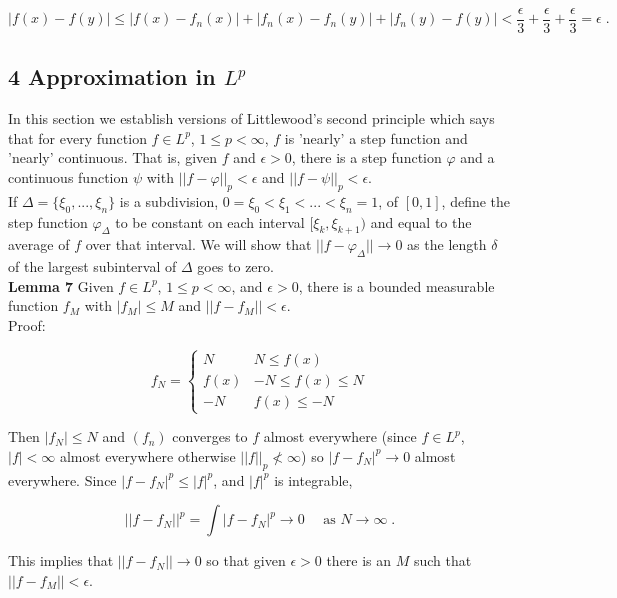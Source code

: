\documentclass[a4paper]{article}
\begin{document}
$$|f(x) - f(y)| \leq |f(x) - f_n(x)| + |f_n(x) - f_n(y)| + |f_n(y) - f(y)| < \frac{\epsilon}{3} + \frac{\epsilon}{3} + \frac{\epsilon}{3} = \epsilon \;.$$

\subsection*{4 Approximation in $L^p$}

In this section we establish versions of Littlewood's second principle which says that for every function $f \in L^p$, $1\leq p < \infty$, $f$ is 'nearly' a step function and 'nearly' continuous. That is, given $f$ and $\epsilon > 0$, there is a step function $\varphi$ and a continuous function $\psi$ with $||f- \varphi||_p < \epsilon$ and $||f - \psi ||_p < \epsilon$. \\

If $\Delta = \{\xi_0,...,\xi_n\}$ is a subdivision, $0 = \xi_0 < \xi_1 < ... < \xi_n = 1$, of $[0,1]$, define the step function $\varphi_{\Delta}$ to be constant on each interval $[\xi_k, \xi_{k+1})$ and equal to the average of $f$ over that interval. We will show that $||f - \varphi_{\Delta}|| \rightarrow 0$ as the length $\delta$ of the largest subinterval of $\Delta$ goes to zero.\\

{\bf Lemma 7} Given $f \in L^p$, $1\leq p < \infty$, and $\epsilon > 0$, there is a bounded measurable function $f_M$ with $|f_M| \leq M$ and $||f - f_M|| < \epsilon$. \\

Proof: 

$$f_N = \begin{cases}
N & N \leq f(x) \\
f(x) & -N \leq f(x) \leq N \\
-N & f(x) \leq -N
\end{cases}$$

Then $|f_N| \leq N$ and $(f_n)$ converges to $f$ almost everywhere (since $f \in L^p$, $|f|< \infty$ almost everywhere otherwise $||f||_p \not< \infty$) so $|f - f_N|^p \rightarrow 0$ almost everywhere. Since $|f - f_N|^p \leq |f|^p$, and $|f|^p$ is integrable, 

$$||f - f_N||^p = \int |f-f_N|^p \rightarrow 0 \quad \text{ as } N \rightarrow \infty \;.$$

This implies that $||f - f_N|| \rightarrow 0$ so that given $\epsilon >0$ there is an $M$ such that $||f - f_M|| < \epsilon$. \\
\end{document}
